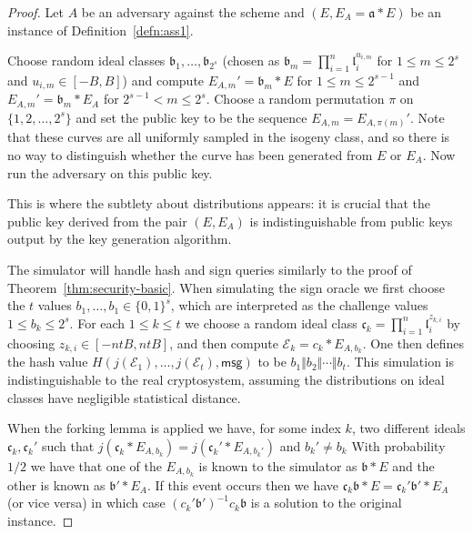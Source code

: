 \documentclass{llncs}
\newcommand{\E}{\mathcal{E}}
\newcommand{\msg}{\mathsf{msg}}
\renewcommand{\a}{\mathfrak{a}}
\renewcommand{\b}{\mathfrak{b}}
\renewcommand{\c}{\mathfrak{c}}
\renewcommand{\l}{\mathfrak{l}}
\begin{document}
\begin{proof}
Let $A$ be an adversary against the scheme and $(E, E_A = \a * E )$ be an instance of Definition~\ref{defn:ass1}.

Choose random ideal classes $\b_1, \dots, \b_{2^s}$
(chosen as $\b_m = \prod_{i=1}^n \l_i^{u_{i,m}}$ for $1 \le m \le 2^s$ and $u_{i,m} \in [-B,B]$)
and compute $E_{A,m}' = \b_m * E$ for $1 \le m \le 2^{s-1}$ and $E_{A,m}' = \b_m * E_A$ for $2^{s-1} < m \le 2^s$. Choose a random permutation $\pi$ on $\{ 1, 2, \dots, 2^s \}$ and set the public key to be the sequence $E_{A,m} = E_{A,\pi(m)}'$.
Note that these curves are all uniformly sampled in the isogeny class, and so there is no way to distinguish whether the curve has been generated from $E$ or $E_A$.
Now run the adversary on this public key.

This is where the subtlety about distributions appears: it is crucial that the public key derived from the pair $(E, E_A)$ is indistinguishable from public keys output by the key generation algorithm.


The simulator will handle hash and sign queries similarly to the proof of Theorem~\ref{thm:security-basic}.
When simulating the sign oracle we first choose the $t$ values $b_1, \dots, b_1 \in \{0,1\}^s$, which are interpreted as the challenge values $1 \le b_k \le 2^s$.
For each $1 \le k \le t$ we choose a random ideal class $\c_k = \prod_{i=1}^n \l_i^{z_{k,i}}$ by choosing $z_{k,i} \in [-ntB, ntB]$, and then compute $\E_k = c_k * E_{A,b_k}$.
One then defines the hash value $H( j(\E_1), \dots, j(\E_t), \msg )$ to be $b_1 \Vert b_2 \Vert \cdots \Vert b_t$.
This simulation is indistinguishable to the real cryptosystem, assuming the distributions on ideal classes have negligible statistical distance.

When the forking lemma is applied we have, for some index $k$, two different ideals $\c_k, \c_k'$ such that $j( \c_k * E_{A, b_k} ) = j( \c_k' * E_{A, b_k'})$ and $b_k' \ne b_k$
With probability $1/2$ we have that one of the $E_{A,b_k}$ is known to the simulator as  $\b * E$ and the other is known as $\b' * E_A$. If this event occurs then we have $\c_k \b * E = \c_k' \b' * E_A$ (or vice versa) in which case $(c_k' \b')^{-1} c_k \b$ is a solution to the original instance.
\end{proof}


\end{document}
